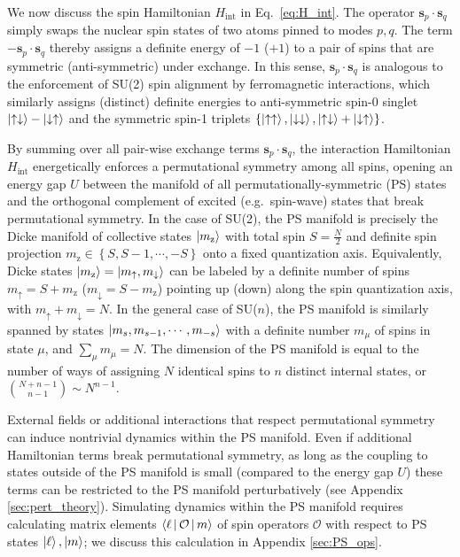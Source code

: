 \documentclass[nofootinbib,twocolumn]{revtex4-2}
\renewcommand{\t}{\text} %
\renewcommand{\set}[1]{\left\{#1\right\}} %
\newcommand{\bk}{\Braket} %
\renewcommand{\v}{\bm} %
\renewcommand{\c}{\cdot} %
\newcommand{\1}{\mathds{1}}
\newcommand{\up}{\uparrow}
\newcommand{\dn}{\downarrow}
\newcommand{\z}{\text{z}}
\renewcommand{\O}{\mathcal{O}}
\begin{document}
We now discuss the spin Hamiltonian $H_{\t{int}}$ in Eq.~\eqref{eq:H_int}.
The operator $\v s_p\c\v s_q$ simply swaps the nuclear spin states of two atoms pinned to modes $p,q$.
The term $-\v s_p\c\v s_q$ thereby assigns a definite energy of $-1$ ($+1$) to a pair of spins that are symmetric (anti-symmetric) under exchange.
In this sense, $\v s_p\c\v s_q$ is analogous to the enforcement of SU(2) spin alignment by ferromagnetic interactions, which similarly assigns (distinct) definite energies to anti-symmetric spin-0 singlet $\ket{\up\dn}-\ket{\dn\up}$ and the symmetric spin-1 triplets $\set{\ket{\up\up},\ket{\dn\dn},\ket{\up\dn}+\ket{\dn\up}}$.

By summing over all pair-wise exchange terms $\v s_p\c\v s_q$, the interaction Hamiltonian $H_{\t{int}}$ energetically enforces a permutational symmetry among all spins, opening an energy gap $U$ between the manifold of all permutationally-symmetric (PS) states and the orthogonal complement of excited (e.g.~spin-wave) states that break permutational symmetry.
In the case of SU(2), the PS manifold is precisely the Dicke manifold of collective states $\ket{m_\z}$ with total spin $S=\frac{N}{2}$ and definite spin projection $m_\z\in\set{S,S-1,\cdots,-S}$ onto a fixed quantization axis.
Equivalently, Dicke states $\ket{m_\z}=\ket{m_\up,m_\dn}$ can be labeled by a definite number of spins $m_\up=S+m_\z$ ($m_\dn=S-m_\z$) pointing up (down) along the spin quantization axis, with $m_\up+m_\dn=N$.
In the general case of SU($n$), the PS manifold is similarly spanned by states $\ket{m_s,m_{s-1},\cdots,m_{-s}}$ with a definite number $m_\mu$ of spins in state $\mu$, and $\sum_\mu m_\mu=N$.
The dimension of the PS manifold is equal to the number of ways of assigning $N$ identical spins to $n$ distinct internal states, or ${N+n-1 \choose n-1} \sim N^{n-1}$.

External fields or additional interactions that respect permutational symmetry can induce nontrivial dynamics within the PS manifold.
Even if additional Hamiltonian terms break permutational symmetry, as long as the coupling to states outside of the PS manifold is small (compared to the energy gap $U$) these terms can be restricted to the PS manifold perturbatively (see Appendix \ref{sec:pert_theory}).
Simulating dynamics within the PS manifold requires calculating matrix elements $\bk{\ell|\O|m}$ of spin operators $\O$ with respect to PS states $\ket\ell,\ket{m}$; we discuss this calculation in Appendix \ref{sec:PS_ops}.
\end{document}
